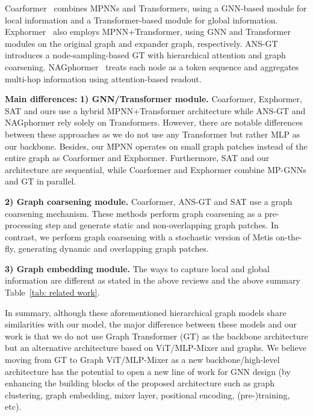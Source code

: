 \documentclass{article}
\begin{document}
Coarformer~\citep{kuang2022coarformer} combines MPNNs and Transformers, using a GNN-based module for local information and a Transformer-based module for global information. Exphormer~\citep{shirzad2023exphormer} also employs MPNN+Transformer, using GNN and Transformer modules on the original graph and expander graph, respectively. ANS-GT~\citep{zhang2022hierarchical_ANSGT} introduces a node-sampling-based GT with hierarchical attention and graph coarsening. NAGphormer~\citep{chen2022nagphormer} treats each node as a token sequence and aggregates multi-hop information using attention-based readout.

\textbf{Main differences:}
\textbf{1) GNN/Transformer module.} Coarformer, Exphormer, SAT and ours use a hybrid MPNN+Transformer architecture while ANS-GT and NAGphormer rely solely on Transformers. However, there are notable differences between these approaches as we do not use any Transformer but rather MLP as our backbone. Besides, our MPNN operates on small graph patches instead of the entire graph as Coarformer and Exphormer. Furthermore, SAT and our architecture are sequential, while Coarformer and Exphormer combine MP-GNNs and GT in parallel.

\textbf{2) Graph coarsening module.} Coarformer, ANS-GT and SAT use a graph coarsening mechanism. These methods perform graph coarsening as a pre-processing step and generate static and non-overlapping graph patches. In contrast, we perform graph coarsening with a stochastic version of Metis on-the-fly, generating dynamic and overlapping graph patches. 



\textbf{3) Graph embedding module.} The ways to capture local and global information are different as stated in the above reviews and the above summary Table~\ref{tab: related work}.

In summary, although these aforementioned hierarchical graph models share similarities with our model, the major difference between these models and our work is that we do not use Graph Transformer (GT) as the backbone architecture but an alternative architecture based on ViT/MLP-Mixer and graphs. We believe moving from GT to Graph ViT/MLP-Mixer as a new backbone/high-level architecture has the potential to open a new line of work for GNN design (by enhancing the building blocks of the proposed architecture such as graph clustering, graph embedding, mixer layer, positional encoding, (pre-)training, etc). 
\end{document}
